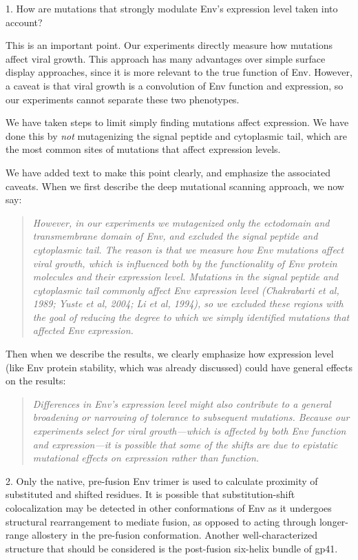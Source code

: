 \documentclass[11pt, oneside]{article}   	%
\begin{document}
1. How are mutations that strongly modulate Env's expression level taken into account? 

{\color{black}
This is an important point.
Our experiments directly measure how mutations affect viral growth.
This approach has many advantages over simple surface display approaches, since it is more relevant to the true function of Env.
However, a caveat is that viral growth is a convolution of Env function and expression, so our experiments cannot separate these two phenotypes.

We have taken steps to limit simply finding mutations affect expression.
We have done this by \emph{not} mutagenizing the signal peptide and cytoplasmic tail, which are the most common sites of mutations that affect expression levels.

We have added text to make this point clearly, and emphasize the associated caveats.
When we first describe the deep mutational scanning approach, we now say:
\begin{quote}
\textsl{
However, in our experiments we mutagenized only the ectodomain and transmembrane domain of Env, and excluded the signal peptide and cytoplasmic tail.
The reason is that we measure how Env mutations affect viral growth, which is influenced both by the functionality of Env protein molecules and their expression level.
Mutations in the signal peptide and cytoplasmic tail commonly affect Env expression level (Chakrabarti et al, 1989; Yuste et al, 2004; Li et al, 1994), so we excluded these regions with the goal of reducing the degree to which we simply identified mutations that affected Env expression.
}
\end{quote}
Then when we describe the results, we clearly emphasize how expression level (like Env protein stability, which was already discussed) could have general effects on the results:
\begin{quote}
\textsl{
Differences in Env's expression level might also contribute to a general broadening or narrowing of tolerance to subsequent mutations.
Because our experiments select for viral growth---which is affected by both Env function and expression---it is possible that some of the shifts are due to epistatic mutational effects on expression rather than function.
}
\end{quote}
}

2. Only the native, pre-fusion Env trimer is used to calculate proximity of substituted and shifted residues. It is possible that substitution-shift colocalization may be detected in other conformations of Env as it undergoes structural rearrangement to mediate fusion, as opposed to acting through longer-range allostery in the pre-fusion conformation. Another well-characterized structure that should be considered is the post-fusion six-helix bundle of gp41. 
\end{document}
